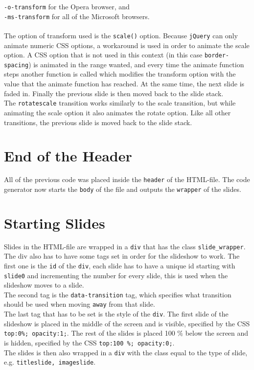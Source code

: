 \texttt{-o-transform} for the Opera browser, and \\
\texttt{-ms-transform} for all of the Microsoft browsers.
\\ \\
The option of transform used is the \texttt{scale()} option. Because \texttt{jQuery} can only animate numeric CSS options, a workaround is used in order to animate the scale option. A CSS option that is not used in this context (in this case \texttt{border-spacing}) is animated in the range wanted, and every time the animate function steps another function is called which modifies the transform option with the value that the animate function has reached. At the same time, the next slide is faded in. Finally the previous slide is then moved back to the slide stack. \\
The \texttt{rotatescale} transition works similarly to the scale transition, but while animating the scale option it also animates the rotate option. Like all other transitions, the previous slide is moved back to the slide stack.

\section{End of the Header}
All of the previous code was placed inside the \texttt{header} of the HTML-file. The code generator now starts the \texttt{body} of the file and outputs the \texttt{wrapper} of the slides.

\section{Starting Slides}
Slides in the HTML-file are wrapped in a \texttt{div} that has the class \texttt{slide\_wrapper}. The div also has to have some tags set in order for the slideshow to work. The first one is the \texttt{id} of the \texttt{div}, each slide has to have a unique id starting with \texttt{slide0} and incrementing the number for every slide, this is used when the slideshow moves to a slide. \\
The second tag is the \texttt{data-transition} tag, which specifies what transition should be used when moving \texttt{away} from that slide. \\
The last tag that has to be set is the style of the \texttt{div}. The first slide of the slideshow is placed in the middle of the screen and is visible, specified by the CSS \texttt{top:0\%; opacity:1;}. The rest of the slides is placed 100 \% below the screen and is hidden, specified by the CSS \texttt{top:100 \%; opacity:0;}. \\
The slides is then also wrapped in a \texttt{div} with the class equal to the type of slide, e.g. \lstinline!titleslide, imageslide!.

